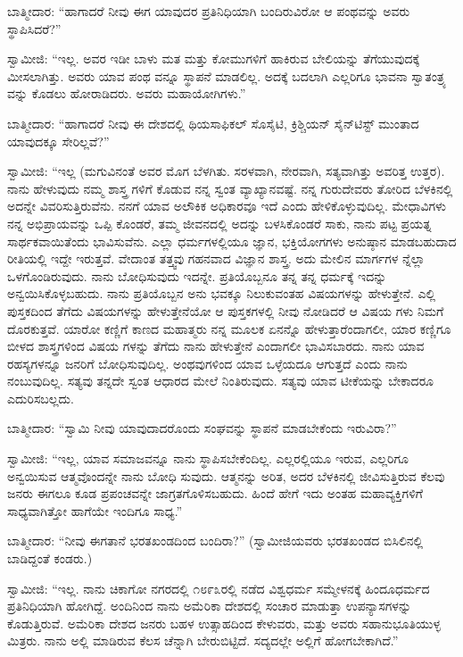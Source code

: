 ಬಾತ್ಮೀದಾರ: “ಹಾಗಾದರೆ ನೀವು ಈಗ ಯಾವುದರ ಪ್ರತಿನಿಧಿಯಾಗಿ ಬಂದಿರುವಿರೋ ಆ ಪಂಥವನ್ನು ಅವರು ಸ್ಥಾಪಿಸಿದರೆ?”

ಸ್ವಾಮೀಜಿ: “ಇಲ್ಲ. ಅವರ ಇಡೀ ಬಾಳು ಮತ ಮತ್ತು ಕೋಮುಗಳಿಗೆ ಹಾಕಿರುವ ಬೇಲಿಯನ್ನು ತೆಗೆಯುವುದಕ್ಕೆ ಮೀಸಲಾಗಿತ್ತು. ಅವರು ಯಾವ ಪಂಥ ವನ್ನೂ ಸ್ಥಾಪನೆ ಮಾಡಲಿಲ್ಲ. ಅದಕ್ಕೆ ಬದಲಾಗಿ ಎಲ್ಲರಿಗೂ ಭಾವನಾ ಸ್ವಾತಂತ್ರ್ಯ ವನ್ನು ಕೊಡಲು ಹೋರಾಡಿದರು. ಅವರು ಮಹಾಯೋಗಿಗಳು.”

ಬಾತ್ಮೀದಾರ: “ಹಾಗಾದರೆ ನೀವು ಈ ದೇಶದಲ್ಲಿ ಥಿಯಸಾಫಿಕಲ್​ ಸೊಸೈಟಿ, ಕ್ರಿಶ್ಚಿಯನ್​ ಸೈನ್​ಟಿಸ್ಟ್​ ಮುಂತಾದ ಯಾವುದಕ್ಕೂ ಸೇರಿಲ್ಲವೆ?”

ಸ್ವಾಮೀಜಿ: “ಇಲ್ಲ (ಮಗುವಿನಂತೆ ಅವರ ಮೊಗ ಬೆಳಗಿತು. ಸರಳವಾಗಿ, ನೇರವಾಗಿ, ಸತ್ಯವಾಗಿತ್ತು ಅವರಿತ್ತ ಉತ್ತರ). ನಾನು ಹೇಳುವುದು ನಮ್ಮ ಶಾಸ್ತ್ರ ಗಳಿಗೆ ಕೊಡುವ ನನ್ನ ಸ್ವಂತ ವ್ಯಾಖ್ಯಾನವಷ್ಟೆ. ನನ್ನ ಗುರುದೇವರು ತೋರಿದ ಬೆಳಕಿನಲ್ಲಿ ಅದನ್ನೇ ವಿವರಿಸುತ್ತಿರುವೆನು. ನನಗೆ ಯಾವ ಅಲೌಕಿಕ ಅಧಿಕಾರವೂ ಇದೆ ಎಂದು ಹೇಳಿಕೊಳ್ಳುವುದಿಲ್ಲ. ಮೇಧಾವಿಗಳು ನನ್ನ ಅಭಿಪ್ರಾಯವನ್ನು ಒಪ್ಪಿ ಕೊಂಡರೆ, ತಮ್ಮ ಜೀವನದಲ್ಲಿ ಅದನ್ನು ಬಳಸಿಕೊಂಡರೆ ಸಾಕು, ನಾನು ಪಟ್ಟ ಪ್ರಯತ್ನ ಸಾರ್ಥಕವಾಯಿತೆಂದು ಭಾವಿಸುವೆನು. ಎಲ್ಲಾ ಧರ್ಮಗಳಲ್ಲಿಯೂ ಜ್ಞಾನ, ಭಕ್ತಿಯೋಗಗಳು ಅನುಷ್ಠಾನ ಮಾಡಬಹುದಾದ ರೀತಿಯಲ್ಲಿ ಇದ್ದೇ ಇರುತ್ತವೆ. ವೇದಾಂತ ತತ್ತ್ವವು ಗಹನವಾದ ವಿಜ್ಞಾನ ಶಾಸ್ತ್ರ. ಅದು ಮೇಲಿನ ಮಾರ್ಗಗಳ ನ್ನೆಲ್ಲಾ ಒಳಗೊಂಡಿರುವುದು. ನಾನು ಬೋಧಿಸುವುದು ಇದನ್ನೇ. ಪ್ರತಿಯೊಬ್ಬನೂ ತನ್ನ ತನ್ನ ಧರ್ಮಕ್ಕೆ ಇದನ್ನು ಅನ್ವಯಿಸಿಕೊಳ್ಳಬಹುದು. ನಾನು ಪ್ರತಿಯೊಬ್ಬನ ಅನು ಭವಕ್ಕೂ ನಿಲುಕುವಂತಹ ವಿಷಯಗಳನ್ನು ಹೇಳುತ್ತೇನೆ. ಎಲ್ಲಿ ಪುಸ್ತಕದಿಂದ ತೆಗೆದು ವಿಷಯಗಳನ್ನು ಹೇಳುತ್ತೇನೆಯೋ ಆ ಪುಸ್ತಕಗಳಲ್ಲಿ ನೀವು ನೋಡಿದರೆ ಆ ವಿಷಯ ಗಳು ನಿಮಗೆ ದೊರಕುತ್ತವೆ. ಯಾರೋ ಕಣ್ಣಿಗೆ ಕಾಣದ ಮಹಾತ್ಮರು ನನ್ನ ಮೂಲಕ ಏನನ್ನೊ ಹೇಳುತ್ತಾರೆಂದಾಗಲೀ, ಯಾರ ಕಣ್ಣಿಗೂ ಬೀಳದ ಶಾಸ್ತ್ರಗಳಿಂದ ವಿಷಯ ಗಳನ್ನು ತೆಗೆದು ನಾನು ಹೇಳುತ್ತೇನೆ ಎಂದಾಗಲೀ ಭಾವಿಸಬಾರದು. ನಾನು ಯಾವ ರಹಸ್ಯಗಳನ್ನೂ ಜನರಿಗೆ ಬೋಧಿಸುವುದಿಲ್ಲ. ಅಂಥವುಗಳಿಂದ ಯಾವ ಒಳ್ಳೆಯದೂ ಆಗುತ್ತದೆ ಎಂದು ನಾನು ನಂಬುವುದಿಲ್ಲ. ಸತ್ಯವು ತನ್ನದೇ ಸ್ವಂತ ಆಧಾರದ ಮೇಲೆ ನಿಂತಿರುವುದು. ಸತ್ಯವು ಯಾವ ಟೀಕೆಯನ್ನು ಬೇಕಾದರೂ ಎದುರಿಸಬಲ್ಲದು.

ಬಾತ್ಮೀದಾರ: “ಸ್ವಾಮಿ ನೀವು ಯಾವುದಾದರೊಂದು ಸಂಘವನ್ನು ಸ್ಥಾಪನೆ ಮಾಡಬೇಕೆಂದು ಇರುವಿರಾ?”

ಸ್ವಾಮೀಜಿ: “ಇಲ್ಲ, ಯಾವ ಸಮಾಜವನ್ನೂ ನಾನು ಸ್ಥಾಪಿಸಬೇಕೆಂದಿಲ್ಲ. ಎಲ್ಲರಲ್ಲಿಯೂ ಇರುವ, ಎಲ್ಲರಿಗೂ ಅನ್ವಯಿಸುವ ಆತ್ಮವೊಂದನ್ನೇ ನಾನು ಬೋಧಿ ಸುವುದು. ಆತ್ಮನನ್ನು ಅರಿತ, ಅದರ ಬೆಳಕಿನಲ್ಲಿ ಜೀವಿಸುತ್ತಿರುವ ಕೆಲವು ಜನರು ಈಗಲೂ ಕೂಡ ಪ್ರಪಂಚವನ್ನೇ ಜಾಗ್ರತಗೊಳಿಸಬಹುದು. ಹಿಂದೆ ಹೇಗೆ ಇದು ಅಂತಹ ಮಹಾವ್ಯಕ್ತಿಗಳಿಗೆ ಸಾಧ್ಯವಾಗಿತ್ತೋ ಹಾಗೆಯೇ ಇಂದಿಗೂ ಸಾಧ್ಯ.”

ಬಾತ್ಮೀದಾರ: “ನೀವು ಈಗತಾನೆ ಭರತಖಂಡದಿಂದ ಬಂದಿರಾ?” (ಸ್ವಾಮೀಜಿಯವರು ಭರತಖಂಡದ ಬಿಸಿಲಿನಲ್ಲಿ ಬಾಡಿದ್ದಂತೆ ಕಂಡರು.)

ಸ್ವಾಮೀಜಿ: “ಇಲ್ಲ. ನಾನು ಚಿಕಾಗೋ ನಗರದಲ್ಲಿ ೧೮೯೩ರಲ್ಲಿ ನಡೆದ ವಿಶ್ವಧರ್ಮ ಸಮ್ಮೇಳನಕ್ಕೆ ಹಿಂದೂಧರ್ಮದ ಪ್ರತಿನಿಧಿಯಾಗಿ ಹೋಗಿದ್ದೆ. ಅಂದಿನಿಂದ ನಾನು ಅಮೆರಿಕಾ ದೇಶದಲ್ಲಿ ಸಂಚಾರ ಮಾಡುತ್ತಾ ಉಪನ್ಯಾಸಗಳನ್ನು ಕೊಡುತ್ತಿರುವೆ. ಅಮೆರಿಕಾ ದೇಶದ ಜನರು ಬಹಳ ಉತ್ಸಾಹದಿಂದ ಕೇಳುವರು, ಮತ್ತು ಅವರು ಸಹಾನುಭೂತಿಯುಳ್ಳ ಮಿತ್ರರು. ನಾನು ಅಲ್ಲಿ ಮಾಡಿರುವ ಕೆಲಸ ಚೆನ್ನಾಗಿ ಬೇರುಬಿಟ್ಟಿದೆ. ಸದ್ಯದಲ್ಲೇ ಅಲ್ಲಿಗೆ ಹೋಗಬೇಕಾಗಿದೆ.”

